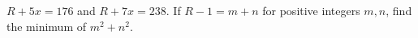 $R+5x=176$ and $R+7x=238$. If $R-1=m+n$ for positive integers $m,n$, find the minimum of $m^2+n^2$.
